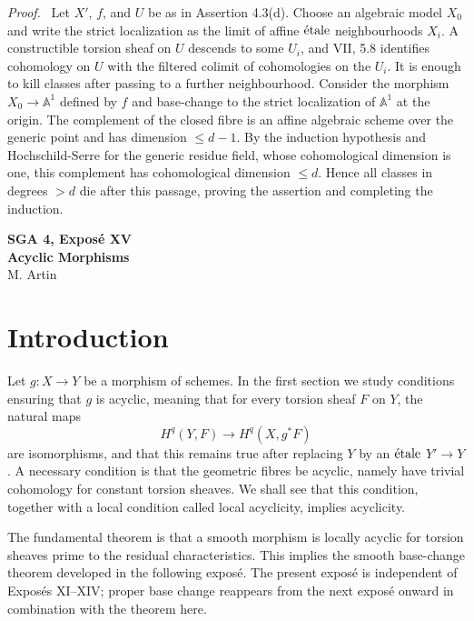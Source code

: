 \documentclass[12pt]{article}
\newcommand{\etale}{\ifmmode\textnormal{\'etale}\else\'etale\fi}
\newenvironment{prooftext}[1][Proof]{\par\noindent\emph{#1.}\ }{\par\medskip}
\begin{document}
\begin{prooftext}
Let \(X'\), \(f\), and \(U\) be as in Assertion 4.3(d). Choose an algebraic model \(X_0\) and write the strict localization as the limit of affine \(\etale\) neighbourhoods \(X_i\). A constructible torsion sheaf on \(U\) descends to some \(U_i\), and VII, 5.8 identifies cohomology on \(U\) with the filtered colimit of cohomologies on the \(U_i\). It is enough to kill classes after passing to a further neighbourhood. Consider the morphism \(X_0\to\mathbb A^1\) defined by \(f\) and base-change to the strict localization of \(\mathbb A^1\) at the origin. The complement of the closed fibre is an affine algebraic scheme over the generic point and has dimension \(\le d-1\). By the induction hypothesis and Hochschild-Serre for the generic residue field, whose cohomological dimension is one, this complement has cohomological dimension \(\le d\). Hence all classes in degrees \(>d\) die after this passage, proving the assertion and completing the induction.
\end{prooftext}

\clearpage
\begin{center}
{\Large \textbf{SGA 4, Expos\'e XV}}\\[0.35em]
{\large \textbf{Acyclic Morphisms}}\\[0.25em]
{\normalsize M. Artin}
\end{center}

\section*{Introduction}

Let \(g:X\to Y\) be a morphism of schemes. In the first section we study conditions ensuring that \(g\) is acyclic, meaning that for every torsion sheaf \(F\) on \(Y\), the natural maps
\[
H^q(Y,F)\longrightarrow H^q(X,g^*F)
\]
are isomorphisms, and that this remains true after replacing \(Y\) by an \(\etale\) \(Y'\to Y\). A necessary condition is that the geometric fibres be acyclic, namely have trivial cohomology for constant torsion sheaves. We shall see that this condition, together with a local condition called local acyclicity, implies acyclicity.

The fundamental theorem is that a smooth morphism is locally acyclic for torsion sheaves prime to the residual characteristics. This implies the smooth base-change theorem developed in the following expos\'e. The present expos\'e is independent of Expos\'es XI--XIV; proper base change reappears from the next expos\'e onward in combination with the theorem here.
\end{document}
